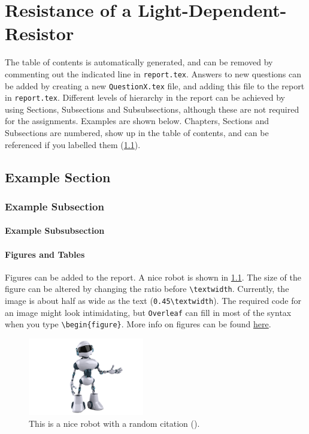 \chapter{Resistance of a Light-Dependent-Resistor}
\noindent The table of contents is automatically generated, and can be removed by commenting out the indicated line in \texttt{report.tex}. Answers to new questions can be added by creating a new \texttt{QuestionX.tex} file, and adding this file to the report in \texttt{report.tex}. Different levels of hierarchy in the report can be achieved by using Sections, Subsections and Subsubsections, although these are not required for the assignments. Examples are shown below. Chapters, Sections and Subsections are numbered, show up in the table of contents, and can be referenced if you labelled them (\cref{sec: example}). 
\section{Example Section} \label{sec: example}
\subsection{Example Subsection}
\subsubsection{Example Subsubsection}

\medskip
\subsubsection{Figures and Tables}
Figures can be added to the report. A nice robot is shown in \cref{fig: robot}. The size of the figure can be altered by changing the ratio before \texttt{\textbackslash textwidth}. Currently, the image is about half as wide as the text (\texttt{0.45\textbackslash textwidth}). The required code for an image might look intimidating, but \texttt{Overleaf} can fill in most of the syntax when you type \texttt{\textbackslash begin\{figure\}}. More info on figures can be found \href{https://www.overleaf.com/learn/latex/Inserting_Images}{here}.
\begin{figure} [!hbt]
    \centering
    \includegraphics[width=0.45\textwidth]{layout/Examples/example_robot.png}
    \caption{This is a nice robot with a random citation (\cite{lansleyanalyseconstruct}).}
    \label{fig: robot}
\end{figure}

